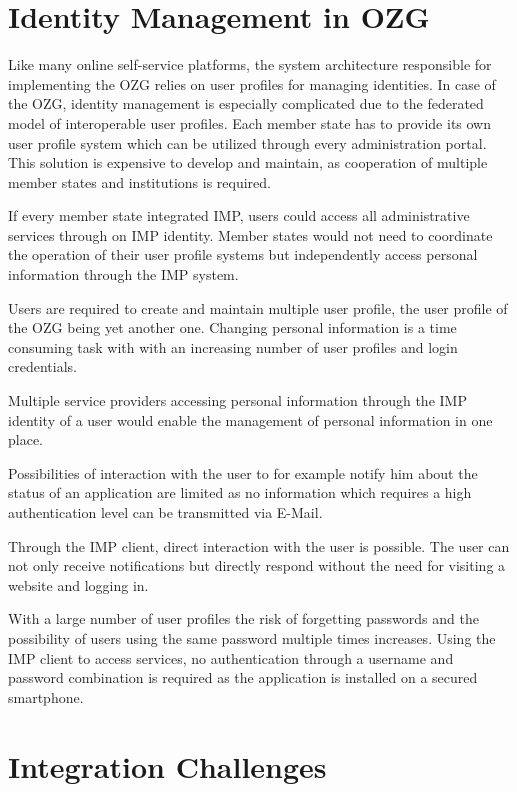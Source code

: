 \section{Identity Management in OZG}
Like many online self-service platforms, the system architecture responsible for implementing the OZG relies on user profiles for managing identities. In case of the OZG, identity management is especially complicated due to the federated model of interoperable user profiles. Each member state has to provide its own user profile system which can be utilized through every administration portal. This solution is expensive to develop and maintain, as cooperation of multiple member states and institutions is required.

If every member state integrated IMP, users could access all administrative services through on IMP identity. Member states would not need to coordinate the operation of their user profile systems but independently access personal information through the IMP system.


Users are required to create and maintain multiple user profile, the user profile of the OZG being yet another one. Changing personal information is a time consuming task with with an increasing number of user profiles and login credentials.

Multiple service providers accessing personal information through the IMP identity of a user would enable the management of personal information in one place.

Possibilities of interaction with the user to for example notify him about the status of an application are limited as no information which requires a high authentication level can be transmitted via E-Mail.

Through the IMP client, direct interaction with the user is possible. The user can not only receive notifications but directly respond without the need for visiting a website and logging in.


With a large number of user profiles the risk of forgetting passwords and the possibility of users using the same password multiple times increases.
Using the IMP client to access services, no authentication through a username and password combination is required as the application is installed on a secured smartphone.


\section{Integration Challenges}

